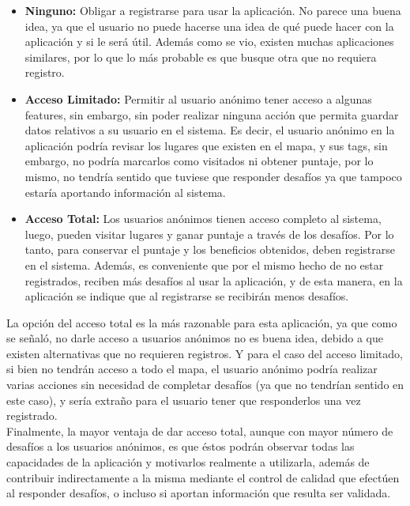 \documentclass[10pt,letterpaper]{article}
\begin{document}
\begin{itemize}
 \item \textbf{Ninguno:} Obligar a registrarse para usar la aplicación. No parece una buena idea, ya que el usuario no puede hacerse una idea de qué puede hacer con la aplicación y si le será útil. Además como se vio, existen muchas aplicaciones similares, por lo que lo más probable es que busque otra que no requiera registro.\\
 \item \textbf{Acceso Limitado:} Permitir al usuario anónimo tener acceso a algunas features, sin embargo, sin poder realizar ninguna acción que permita guardar datos relativos a su usuario en el sistema. Es decir, el usuario anónimo en la aplicación podría revisar los lugares que existen en el mapa, y sus tags, sin embargo, no podría marcarlos como visitados ni obtener puntaje, por lo mismo, no tendría sentido que tuviese que responder desafíos ya que tampoco estaría aportando información al sistema.\\
 \item \textbf{Acceso Total:} Los usuarios anónimos tienen acceso completo al sistema, luego, pueden visitar lugares y ganar puntaje a través de los desafíos. Por lo tanto,  para conservar el puntaje y los beneficios obtenidos, deben registrarse en el sistema. Además, es conveniente que por el mismo hecho de no estar registrados, reciben más desafíos al usar la aplicación, y de esta manera, en la aplicación se indique que al registrarse se recibirán menos desafíos.
\end{itemize}

La opción del acceso total es la más razonable para esta aplicación, ya que como se señaló, no darle acceso a usuarios anónimos no es buena idea, debido a que existen alternativas que no requieren registros. Y para el caso del acceso limitado, si bien no tendrán acceso a todo el mapa, el usuario anónimo podría realizar varias acciones sin necesidad de completar desafíos (ya que no tendrían sentido en este caso), y sería extraño para el usuario tener que responderlos una vez registrado.\\

Finalmente, la mayor ventaja de dar acceso total, aunque con mayor número de desafíos a los usuarios anónimos, es que éstos podrán observar todas las capacidades de la aplicación y motivarlos realmente a utilizarla, además de contribuir indirectamente a la misma mediante el control de calidad que efectúen al responder desafíos, o incluso si aportan información que resulta ser validada.\\
\end{document}
